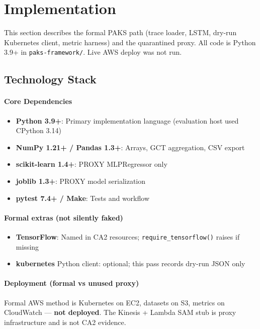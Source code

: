 
\section{Implementation}
\label{sec:Implementation}

This section describes the formal PAKS path (trace loader, LSTM, dry-run Kubernetes client, metric harness) and the quarantined proxy. All code is Python 3.9+ in \texttt{paks-framework/}. Live AWS deploy was not run.

\subsection{Technology Stack}

\paragraph{Core Dependencies}
\begin{itemize}
  \item \textbf{Python 3.9+}: Primary implementation language (evaluation host used CPython 3.14)
  \item \textbf{NumPy 1.21+ / Pandas 1.3+}: Arrays, GCT aggregation, CSV export
  \item \textbf{scikit-learn 1.4+}: PROXY MLPRegressor only
  \item \textbf{joblib 1.3+}: PROXY model serialization
  \item \textbf{pytest 7.4+ / Make}: Tests and workflow
\end{itemize}

\paragraph{Formal extras (not silently faked)}
\begin{itemize}
  \item \textbf{TensorFlow}: Named in CA2 resources; \texttt{require\_tensorflow()} raises if missing
  \item \textbf{kubernetes} Python client: optional; this pass records dry-run JSON only
\end{itemize}

\paragraph{Deployment (formal vs unused proxy)}
Formal AWS method is Kubernetes on EC2, datasets on S3, metrics on CloudWatch --- \textbf{not deployed}. The Kinesis + Lambda SAM stub is proxy infrastructure and is not CA2 evidence.


